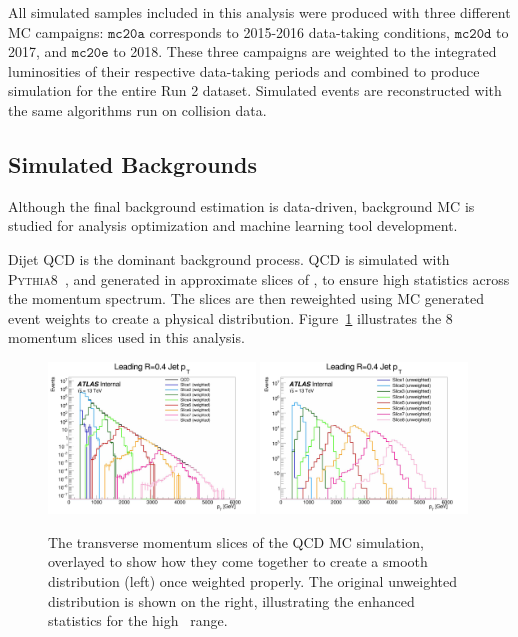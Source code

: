 All simulated samples included in this analysis were produced with three different MC campaigns: $\texttt{mc20a}$ corresponds to 2015-2016 data-taking conditions, $\texttt{mc20d}$ to 2017, and $\texttt{mc20e}$ to 2018. These three campaigns are weighted to the integrated luminosities of their respective data-taking periods and combined to produce simulation for the entire Run 2 dataset. Simulated events are reconstructed with the same algorithms run on collision data. 


\subsection{Simulated Backgrounds}
\label{subsec:bkg_mc}

Although the final background estimation is data-driven, background MC is studied for analysis optimization and machine learning tool development.\par

Dijet QCD is the dominant background process. QCD is simulated with \textsc{Pythia8}~\cite{pythia}, and generated in approximate slices of \pt, to ensure high statistics across the momentum spectrum. The slices are then reweighted using MC generated event weights to create a physical distribution. Figure~\ref{fig:jzslices} illustrates the 8 momentum slices used in this analysis.

\begin{figure}
        \centering
	\includegraphics[width=0.49\textwidth]{figures/ch6/jz_slices}
	\includegraphics[width=0.49\textwidth]{figures/ch6/jz_slices_uw}
	\caption{The transverse momentum slices of the QCD MC simulation, overlayed to show how they come together to create a smooth distribution (left) once weighted properly. The original unweighted distribution is shown on the right, illustrating the enhanced statistics for the high \pt~range. 
	\label{fig:jzslices}}
\end{figure}

